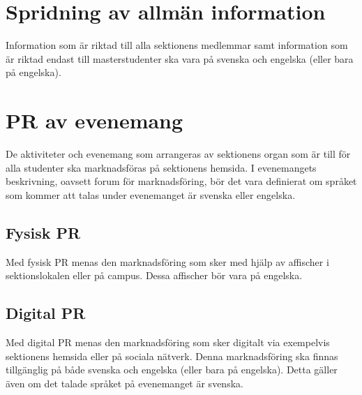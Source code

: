 \documentclass[11pt, includeaddress]{classes/cthit}
\begin{document}
\section{Spridning av allmän information}
Information som är riktad till alla sektionens medlemmar samt information som är riktad endast till masterstudenter ska vara på svenska och engelska (eller bara på engelska).

\newpage

\section{PR av evenemang}
De aktiviteter och evenemang som arrangeras av sektionens organ som är till för alla studenter ska marknadsföras på sektionens hemsida. I evenemangets beskrivning, oavsett forum för marknadsföring, bör det vara definierat om språket som kommer att talas under evenemanget är svenska eller engelska.

\subsection*{Fysisk PR}
Med fysisk PR menas den marknadsföring som sker med hjälp av affischer i sektionslokalen eller på campus. Dessa affischer bör vara på engelska.
\subsection*{Digital PR}
Med digital PR menas den marknadsföring som sker digitalt via exempelvis sektionens hemsida eller på sociala nätverk. Denna marknadsföring ska finnas tillgänglig på både svenska och engelska (eller bara på engelska). Detta gäller även om det talade språket på evenemanget är svenska.
\end{document}
